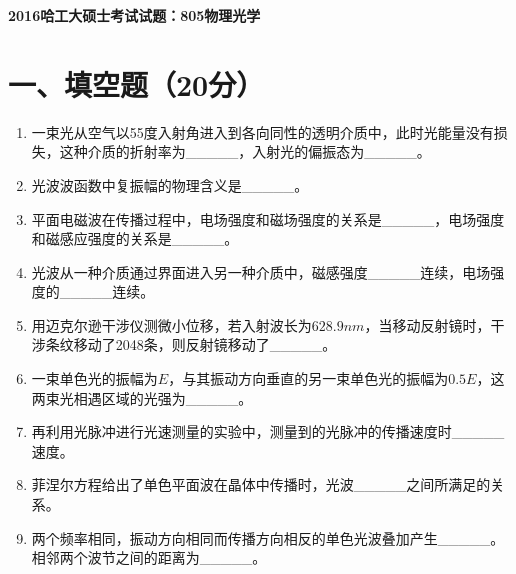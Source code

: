 \documentclass[12pt, a4paper]{article}
\theoremstyle{solution}
\begin{document}
\begin{center}
\Large\textbf{2016哈工大硕士考试试题：805物理光学}
\end{center}





\section*{一、填空题（20分）}
\begin{enumerate}
    \item 一束光从空气以55度入射角进入到各向同性的透明介质中，此时光能量没有损失，这种介质的折射率为\_\_\_\_\_，入射光的偏振态为\_\_\_\_\_。
    \item 光波波函数中复振幅的物理含义是\_\_\_\_\_。
    \item 平面电磁波在传播过程中，电场强度和磁场强度的关系是\_\_\_\_\_，电场强度和磁感应强度的关系是\_\_\_\_\_。
    \item 光波从一种介质通过界面进入另一种介质中，磁感强度\_\_\_\_\_连续，电场强度的\_\_\_\_\_连续。
    \item 用迈克尔逊干涉仪测微小位移，若入射波长为$628.9nm$，当移动反射镜时，干涉条纹移动了2048条，则反射镜移动了\_\_\_\_\_。
    \item 一束单色光的振幅为$E$，与其振动方向垂直的另一束单色光的振幅为$0.5E$，这两束光相遇区域的光强为\_\_\_\_\_。
    \item 再利用光脉冲进行光速测量的实验中，测量到的光脉冲的传播速度时\_\_\_\_\_速度。
    \item 菲涅尔方程给出了单色平面波在晶体中传播时，光波\_\_\_\_\_之间所满足的关系。
    \item 两个频率相同，振动方向相同而传播方向相反的单色光波叠加产生\_\_\_\_\_。相邻两个波节之间的距离为\_\_\_\_\_。
\end{enumerate}
\end{document}
